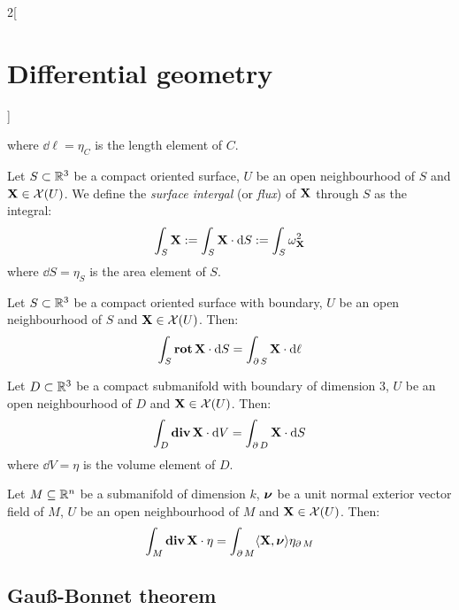 \documentclass[../../../main_math.tex]{subfiles}
\begin{document}
\begin{multicols}{2}[\section{Differential geometry}]
\begin{definition}
    where $\dd{\ell}=\eta_C$ is the length element of $C$.
  \end{definition}
  \begin{definition}
    Let $S\subset\mathbb{R}^3$ be a compact oriented surface, $U$ be an open neighbourhood of $S$ and $\boldsymbol{\mathrm{X}}\in\mathcal{X}(U)$. We define the \emph{surface intergal} (or \emph{flux}) of $\boldsymbol{\mathrm{X}}$ through $S$ as the integral: $$\int_S\boldsymbol{\mathrm{X}}:=\int_S\boldsymbol{\mathrm{X}}\cdot\dd{S}:=\int_S\omega_{\boldsymbol{\mathrm{X}}}^2$$
    where $\dd{S}=\eta_S$ is the area element of $S$.
  \end{definition}
  \begin{theorem}
    Let $S\subset\mathbb{R}^3$ be a compact oriented surface with boundary, $U$ be an open neighbourhood of $S$ and $\boldsymbol{\mathrm{X}}\in\mathcal{X}(U)$. Then: $$\int_S\operatorname{\boldsymbol{\mathrm{rot}}}{\boldsymbol{\mathrm{X}}}\cdot\dd{S}=\int_{\operatorname{\partial}{S}}\boldsymbol{\mathrm{X}}\cdot\dd{\ell}$$
  \end{theorem}
  \begin{theorem}
    Let $D\subset\mathbb{R}^3$ be a compact submanifold with boundary of dimension 3, $U$ be an open neighbourhood of $D$ and $\boldsymbol{\mathrm{X}}\in\mathcal{X}(U)$. Then: $$\int_D\operatorname{\boldsymbol{\mathrm{div}}}{\boldsymbol{\mathrm{X}}}\cdot\dd{V}=\int_{\operatorname{\partial}{D}}\boldsymbol{\mathrm{X}}\cdot\dd{S}$$
    where $\dd{V}=\eta$ is the volume element of $D$.
  \end{theorem}
  \begin{theorem}\label{DG:divergenceRn}
    Let $M\subseteq\mathbb{R}^n$ be a submanifold of dimension $k$, $\boldsymbol{\mathrm{\nu}}$ be a unit normal exterior vector field of $M$, $U$ be an open neighbourhood of $M$ and $\boldsymbol{\mathrm{X}}\in\mathcal{X}(U)$. Then: $$\int_M\operatorname{\boldsymbol{\mathrm{div}}}{\boldsymbol{\mathrm{X}}}\cdot\eta=\int_{\operatorname{\partial}{M}}\langle\boldsymbol{\mathrm{X}},\boldsymbol{\mathrm{\nu}}\rangle\eta_{\operatorname{\partial}{M}}$$
  \end{theorem}
  \subsection{Gau\ss-Bonnet theorem}

\end{multicols}
\end{document}
